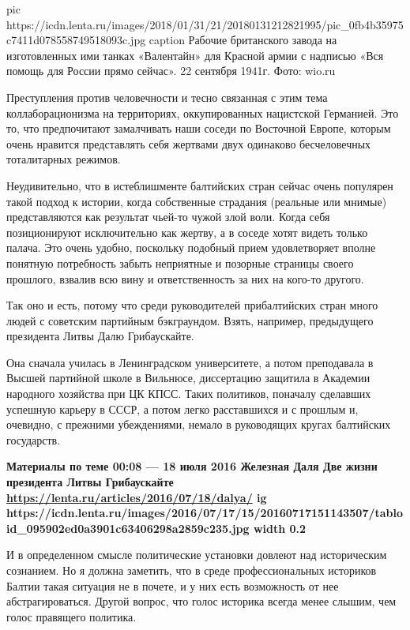 \ifcmt
pic https://icdn.lenta.ru/images/2018/01/31/21/20180131212821995/pic_0fb4b35975c7411d078558749518093c.jpg
caption Рабочие британского завода на изготовленных ими танках «Валентайн» для Красной армии с надписью «Вся помощь для России прямо сейчас». 22 сентября 1941г.  Фото: wio.ru
\fi


Преступления против человечности и тесно связанная с этим тема
коллаборационизма на территориях, оккупированных нацистской Германией. Это то,
что предпочитают замалчивать наши соседи по Восточной Европе, которым очень
нравится представлять себя жертвами двух одинаково бесчеловечных тоталитарных
режимов.

Неудивительно, что в истеблишменте балтийских стран сейчас очень популярен
такой подход к истории, когда собственные страдания (реальные или мнимые)
представляются как результат чьей-то чужой злой воли. Когда себя позиционируют
исключительно как жертву, а в соседе хотят видеть только палача. Это очень
удобно, поскольку подобный прием удовлетворяет вполне понятную потребность
забыть неприятные и позорные страницы своего прошлого, взвалив всю вину и
ответственность за них на кого-то другого.


Так оно и есть, потому что среди руководителей прибалтийских стран много людей
с советским партийным бэкграундом. Взять, например, предыдущего президента
Литвы Далю Грибаускайте.

Она сначала училась в Ленинградском университете, а потом преподавала в Высшей
партийной школе в Вильнюсе, диссертацию защитила в Академии народного хозяйства
при ЦК КПСС. Таких политиков, поначалу сделавших успешную карьеру в СССР, а
потом легко расставшихся и с прошлым и, очевидно, с прежними убеждениями,
немало в руководящих кругах балтийских государств.

\begin{leftbar}
	\bfseries
	Материалы по теме
00:08 — 18 июля 2016
Железная Даля
Две жизни президента Литвы Грибаускайте
\url{https://lenta.ru/articles/2016/07/18/dalya/}
\ifcmt
	ig https://icdn.lenta.ru/images/2016/07/17/15/20160717151143507/tabloid_095902ed0a3901c63406298a2859c235.jpg
	width 0.2
\fi
\end{leftbar}

И в определенном смысле политические установки довлеют над историческим
сознанием. Но я должна заметить, что в среде профессиональных историков Балтии
такая ситуация не в почете, и у них есть возможность от нее абстрагироваться.
Другой вопрос, что голос историка всегда менее слышим, чем голос правящего
политика.
